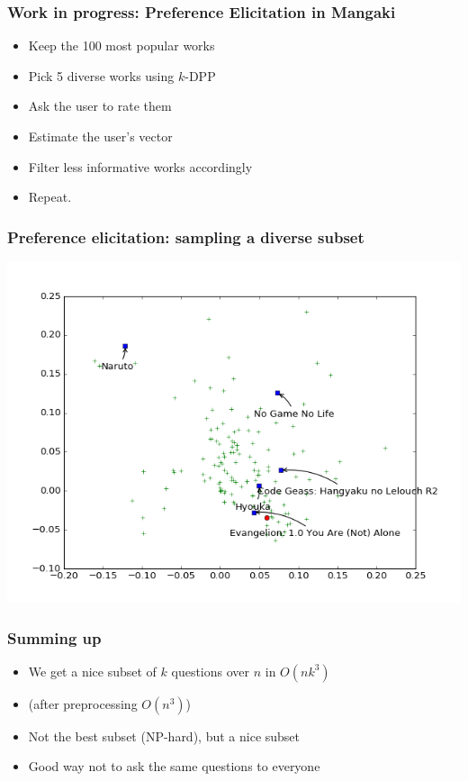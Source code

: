 \documentclass[handout]{beamer}
\begin{document}
\begin{frame}
  \frametitle{Work in progress: Preference Elicitation in Mangaki}
  \begin{itemize}
  \item Keep the 100 most popular works
  \item Pick 5 diverse works using $k$-DPP
  \item Ask the user to rate them
  \item Estimate the user's vector
  \item Filter less informative works accordingly
  \item Repeat.
  \end{itemize}
\end{frame}

\begin{frame}
  \frametitle{Preference elicitation: sampling a diverse subset}
  \includegraphics[width=\linewidth]{figures/1.png}
\end{frame}

\begin{frame}
  \frametitle{Summing up}
  \begin{itemize}
    \item We get a nice subset of $k$ questions over $n$ in $O(nk^3)$
    \item (after preprocessing $O(n^3)$)
    \item Not the best subset (NP-hard), but a nice subset
    \item Good way not to ask the same questions to everyone
  \end{itemize}
\end{frame}
\end{document}
